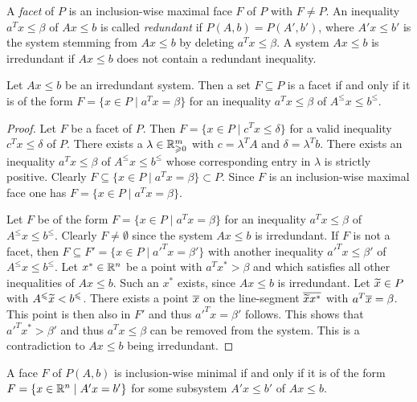 A \emph{facet} of $P$ is an inclusion-wise maximal face $F$ of $P$
with $F\neq P$.  An inequality $a^Tx\leq\beta$ of $Ax\leq b$ is called
\emph{redundant} if $P(A,b) = P(A',b')$, where $A'x\leq b'$ is the system
stemming from $Ax\leq b$ by deleting $a^Tx\leq\beta$.  A system $Ax\leq b$ is
irredundant if $Ax\leq b$ does not contain a redundant inequality.

\begin{lemma}
  \label{po:lem:1}
  Let $Ax\leq b$ be an irredundant system. 
  Then a set $F\subseteq P$ is a facet if and only if it is
  of the form $F = \{ x \in P \mid a^Tx = \beta\}$ for an
  inequality $a^Tx\leq\beta$ of $A^\leq x\leq b^\leq$. 
\end{lemma}


\begin{proof}
  Let $F$ be a facet of $P$. Then $F = \{x \in P \mid c^Tx\leq\delta\}$ for a valid
  inequality $c^Tx\leq\delta$ of $P$. There exists a $\lambda \in \mathbb{R}_{\geqslant0}^m$ with
  $c=\lambda^TA$ and $\delta=\lambda^Tb$.  There exists an inequality  $a^Tx\leq\beta$ of
  $A^\leq x\leq b^\leq$ whose corresponding entry in $\lambda$ is strictly
  positive. Clearly $F\subseteq\{x \in P \mid a^Tx=\beta\}\subset P$. Since $F$ is an
  inclusion-wise maximal face one has $F = \{x \in P \mid a^Tx=\beta\}$. 
  
  Let $F$ be of the form $F = \{ x \in P \mid a^Tx = \beta\}$ for an inequality
  $a^Tx\leq\beta$ of $A^\leq x\leq b^\leq$.  Clearly $F \neq \emptyset$ since the system $Ax\leq b$ is
  irredundant. If $F$ is not a facet, then $F\subseteq F'=\{ x \in P \mid a'^Tx = \beta'\}$
  with another inequality $a'^Tx\leq\beta'$ of $A^\leq x\leq b^\leq$. Let $x^*\in \mathbb{R}^n$ be a point with
  $a^Tx^*>\beta$ and which satisfies all other inequalities of $Ax\leq b$. Such an $x^*$
  exists, since $Ax\leq b$ is irredundant.  Let $\widetilde{x}\in P$ with
  $A^\leqslant\widetilde{x}<b^\leqslant$.  There exists   a point $\overline{x}$ on the
  line-segment $\overline{\widetilde{x}x^*}$ with   $a^T\overline{x}=\beta$.  This point is then
  also in $F'$ and thus $a'^Tx = \beta'$ follows. This shows that
  $a'^Tx^*>\beta'$
  and thus $a^Tx\leq\beta$ can be
  removed from the system.  This is a contradiction to 
   $Ax\leq b$ being irredundant.  
\end{proof}



\begin{lemma}
  \label{po:lem:5}
  A face $F$ of $P(A,b)$ is inclusion-wise minimal if and only if it
  is of the form $F = \{ x \in \mathbb{R}^n \mid A'x=b'\}$ for some subsystem
    $A'x\leq b'$ of $Ax\leq b$. 
\end{lemma}


